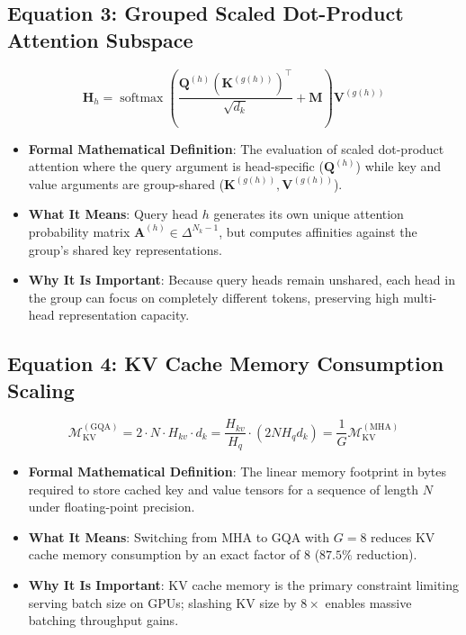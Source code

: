 \documentclass[11pt,a4paper]{article}
\theoremstyle{definition}
\begin{document}
\subsection{\textbf{Equation 3: Grouped Scaled Dot-Product Attention Subspace}}
{\boldmath
\begin{equation}
\mathbf{H}_h = \operatorname{softmax}\left(\frac{\mathbf{Q}^{(h)} (\mathbf{K}^{(g(h))})^\top}{\sqrt{d_k}} + \mathbf{M}\right)\mathbf{V}^{(g(h))}
\end{equation}
}
\begin{itemize}
    \item \textbf{Formal Mathematical Definition}:
    The evaluation of scaled dot-product attention where the query argument is head-specific ($\mathbf{Q}^{(h)}$) while key and value arguments are group-shared ($\mathbf{K}^{(g(h))}, \mathbf{V}^{(g(h))}$).
    \item \textbf{What It Means}:
    Query head $h$ generates its own unique attention probability matrix $\mathbf{A}^{(h)} \in \Delta^{N_k - 1}$, but computes affinities against the group's shared key representations.
    \item \textbf{Why It Is Important}:
    Because query heads remain unshared, each head in the group can focus on completely different tokens, preserving high multi-head representation capacity.
\end{itemize}

\subsection{\textbf{Equation 4: KV Cache Memory Consumption Scaling}}
{\boldmath
\begin{equation}
\mathcal{M}_{\text{KV}}^{(\text{GQA})} = 2 \cdot N \cdot H_{kv} \cdot d_k = \frac{H_{kv}}{H_q} \cdot \left( 2 N H_q d_k \right) = \frac{1}{G} \mathcal{M}_{\text{KV}}^{(\text{MHA})}
\end{equation}
}
\begin{itemize}
    \item \textbf{Formal Mathematical Definition}:
    The linear memory footprint in bytes required to store cached key and value tensors for a sequence of length $N$ under floating-point precision.
    \item \textbf{What It Means}:
    Switching from MHA to GQA with $G = 8$ reduces KV cache memory consumption by an exact factor of 8 ($87.5\%$ reduction).
    \item \textbf{Why It Is Important}:
    KV cache memory is the primary constraint limiting serving batch size on GPUs; slashing KV size by $8\times$ enables massive batching throughput gains.
\end{itemize}
\end{document}

